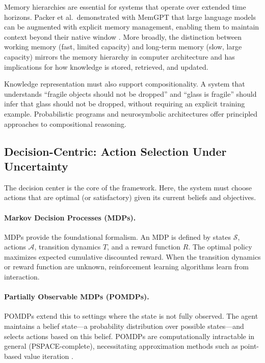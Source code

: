 \documentclass[11pt,a4paper]{article}
\begin{document}
Memory hierarchies are essential for systems that operate over extended time horizons. Packer et al.\ demonstrated with MemGPT that large language models can be augmented with explicit memory management, enabling them to maintain context beyond their native window \citep{packer2023memgpt}. More broadly, the distinction between working memory (fast, limited capacity) and long-term memory (slow, large capacity) mirrors the memory hierarchy in computer architecture and has implications for how knowledge is stored, retrieved, and updated.

Knowledge representation must also support compositionality. A system that understands ``fragile objects should not be dropped'' and ``glass is fragile'' should infer that glass should not be dropped, without requiring an explicit training example. Probabilistic programs \citep{goodman2008church} and neurosymbolic architectures offer principled approaches to compositional reasoning.

\subsection{Decision-Centric: Action Selection Under Uncertainty}

The decision center is the core of the framework. Here, the system must choose actions that are optimal (or satisfactory) given its current beliefs and objectives.

\paragraph{Markov Decision Processes (MDPs).} MDPs provide the foundational formalism. An MDP is defined by states $\mathcal{S}$, actions $\mathcal{A}$, transition dynamics $T$, and a reward function $R$. The optimal policy maximizes expected cumulative discounted reward. When the transition dynamics or reward function are unknown, reinforcement learning algorithms \citep{sutton2018reinforcement} learn from interaction.

\paragraph{Partially Observable MDPs (POMDPs).} POMDPs extend this to settings where the state is not fully observed. The agent maintains a belief state---a probability distribution over possible states---and selects actions based on this belief. POMDPs are computationally intractable in general (PSPACE-complete), necessitating approximation methods such as point-based value iteration \citep{pineau2003point}.
\end{document}
